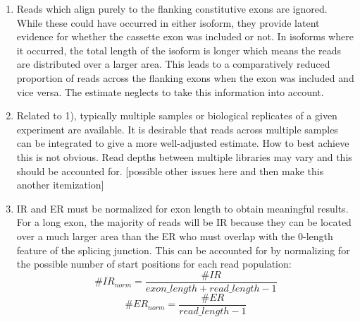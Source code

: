 \begin{enumerate}
	\item Reads which align purely to the flanking constitutive exons are ignored. While these could have occurred in either isoform, they provide latent evidence for whether the cassette exon was included or not. In isoforms where it occurred, the total length of the isoform is longer which means the reads are distributed over a larger area. This leads to a comparatively reduced proportion of reads across the flanking exons when the exon was included and vice versa. The estimate neglects to take this information into account.
	\item Related to 1), typically multiple samples or biological replicates of a given experiment are available. It is desirable that reads across multiple samples can be integrated to give a more well-adjusted estimate. How to best achieve this is not obvious. Read depths between multiple libraries may vary and this should be accounted for. [possible other issues here and then make this another itemization]
	\item IR and ER must be normalized for exon length to obtain meaningful results. For a long exon, the majority of reads will be IR because they can be located over a much larger area than the ER who must overlap with the 0-length feature of the splicing junction. This can be accounted for by normalizing for the possible number of start positions for each read population:
	$$\#IR_{norm} = \frac{\#IR}{exon\_length + read\_length -1}$$
	$$\#ER_{norm} = \frac{\#ER}{read\_length - 1}$$
	


\end{enumerate}
